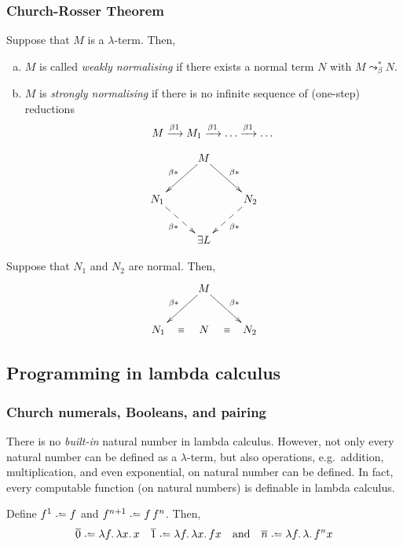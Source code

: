\subsubsection*{Church-Rosser Theorem}
\begin{definition}
  Suppose that $M$ is a $\lambda$-term. Then, 
  \begin{enumerate}[(a)]
    \item $M$ is called \emph{weakly normalising} if there exists
      a normal term $N$ with $M \leadsto^*_{\beta} N$. 
    \item $M$ is \emph{strongly normalising} if there is no infinite sequence of
      (one-step) reductions 
      \[
        M \xrightarrow{\beta1} M_1 \xrightarrow{\beta1} \dots \xrightarrow{\beta1} \dots
      \]
  \end{enumerate}
\end{definition}
\begin{theorem}
  \[
    \xymatrix{
      & M \ar[rd]^{\beta*} \ar[ld]_{\beta*} \\
      N_1 \ar@{-->}[rd]_{\beta*} & & N_2 \ar@{-->}[ld]^{\beta*} \\
      & \exists L
    }
  \]
\end{theorem}
\begin{corollary}
  Suppose that $N_1$ and $N_2$ are normal. Then, 
  \[
    \xymatrix{
      & M \ar[rd]^{\beta*} \ar[ld]_{\beta*} \\
      N_1 \ar@{}[r]|\equiv & N & N_2 \ar@{}[l]|\equiv \\
    }
  \]
\end{corollary}
\subsection{Programming in lambda calculus}
\subsubsection*{Church numerals, Booleans, and pairing}
There is no \emph{built-in} natural number in lambda calculus. However, 
not only every natural number can be defined as a $\lambda$-term, but also 
operations, e.g.\ addition, multiplication, and even exponential, on natural
number can be defined. In fact, every computable function (on natural numbers)
is definable in lambda calculus. 

\begin{definition}
  Define $f^1 \defeq f$ and $f^{n+1} \defeq f\,f^n$. Then, 
  \[
    \overline{0} \defeq \lambda f.\, \lambda x.\, x
    \quad
    \overline{1} \defeq \lambda f.\, \lambda x.\, f x
    \quad\text{and}\quad
    \overline{n} \defeq \lambda f.\, \lambda.\, f^{n} x
  \] 
\end{definition}


